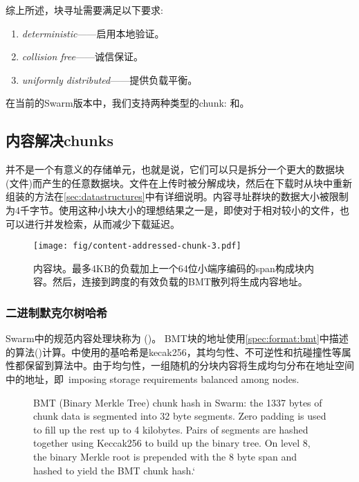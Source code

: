 综上所述，块寻址需要满足以下要求:

\begin{enumerate}
    \item \emph{deterministic}——启用本地验证。
    \item \emph{collision free}——诚信保证。
    \item \emph{uniformly distributed}——提供负载平衡。
\end{enumerate}

在当前的Swarm版本中，我们支持两种类型的chunk: 和。 

\subsection{内容解决chunks\statusgreen}\label{sec:content-addressed-chunks}

并不是一个有意义的存储单元，也就是说，它们可以只是拆分一个更大的数据块(文件)而产生的任意数据块。文件在上传时被分解成块，然后在下载时从块中重新组装的方法在\ref{sec:datastructures}中有详细说明。内容寻址群块的数据大小被限制为4千字节。使用这种小块大小的理想结果之一是，即使对于相对较小的文件，也可以进行并发检索，从而减少下载延迟。 

\begin{figure}[htbp]
   \centering
   \texttt{[image: fig/content-addressed-chunk-3.pdf]}
   \caption[内容解决chunk\statusgreen]{内容块。最多4KB的负载加上一个64位小端序编码的span构成块内容。然后，连接到跨度的有效负载的BMT散列将生成内容地址。}
   \label{fig:content-addressed-chunk}
\end{figure}

\subsubsection{二进制默克尔树哈希}

Swarm中的规范内容处理块称为 ()。
BMT块的地址使用\ref{spec:format:bmt}中描述的算法()计算。中使用的基哈希是kecak256，其均匀性、不可逆性和抗碰撞性等属性都保留到算法中。由于均匀性，一组随机的分块内容将生成均匀分布在地址空间中的地址，即\ imposing storage requirements balanced among nodes.
\begin{figure}[htbp]
   \centering
   \resizebox{1\textwidth}{!}{
   }
   \caption[BMT: Binary Merkle Tree hash used as chunk hash in Swarm \statusgreen]{BMT (Binary Merkle Tree) chunk hash in Swarm: the 1337 bytes of chunk data is segmented into 32 byte segments. Zero padding is used to fill up the rest up to 4 kilobytes. Pairs of segments are hashed together using Keccak256 to build up the binary tree. On level 8, the binary Merkle root is prepended with the 8 byte span and hashed to yield the BMT chunk hash.`}
   \label{fig:BMT}
\end{figure}

